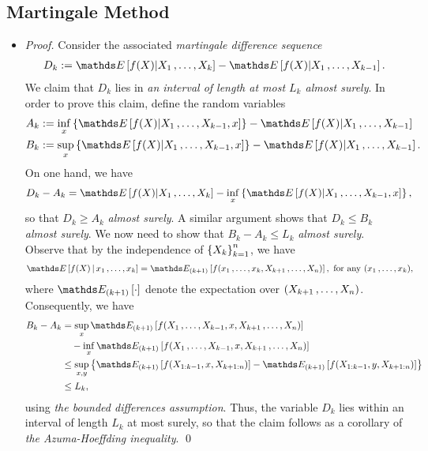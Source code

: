 \documentclass[11pt]{article}
\begin{document}
\subsection{Martingale Method}
\begin{itemize}
\item \begin{proof}
Consider the associated \emph{martingale difference sequence}
\begin{align*}
D_k := \E{}{f(X) | X_1 \xdotx{,} X_k} - \E{}{f(X) | X_1 \xdotx{,} X_{k-1}}.
\end{align*}
We claim that $D_k$ lies in \emph{an interval of length at most $L_k$ almost surely}. In order to prove this claim, define the random variables
\begin{align*}
A_k &:= \inf_x \set{\E{}{f(X) | X_1 \xdotx{,} X_{k-1}, x}} - \E{}{f(X) | X_1 \xdotx{,} X_{k-1}} \\
B_k &:= \sup_{x} \set{\E{}{f(X) | X_1 \xdotx{,} X_{k-1}, x}} - \E{}{f(X) | X_1 \xdotx{,} X_{k-1}}.
\end{align*}
On one hand, we have
\begin{align*}
D_k - A_k &=  \E{}{f(X) | X_1 \xdotx{,} X_k} - \inf_x \set{\E{}{f(X) | X_1 \xdotx{,} X_{k-1}, x}},
\end{align*}
so that $D_k \ge  A_k$ \emph{almost surely}. A similar argument shows that $D_k \le B_k$ \emph{almost surely}.
We now need to show that $B_k - A_k \le L_k$ \emph{almost surely}. Observe that by the independence of $\left\{X_k\right\}^n_{k=1}$, we have
\begin{align*}
\E{}{f(X) \,|\, x_1 \xdotx{,} x_k } &= \E{(k+1)}{f(x_1 \xdotx{,} x_k, X_{k+1} \xdotx{,} X_n)},\text{ for any }(x_1 \xdotx{,} x_k),
\end{align*}  where $\E{(k+1)}{\cdot}$ denote the expectation over $(X_{k+1} \,{,}\ldots{,}\, X_n)$.
Consequently, we have
\begin{align*}
B_k - A_k &=  \sup_{x} \E{(k+1)}{f(X_1 \xdotx{,} X_{k-1}, x, X_{k+1} \xdotx{,} X_n)}  \\
&\quad - \inf_x  \E{(k+1)}{f(X_1 \xdotx{,} X_{k-1}, x, X_{k+1} \xdotx{,} X_n)} \\
&\le  \sup_{x,y}\set{\E{(k+1)}{f(X_{1:k-1}, x, X_{k+1:n})} - \E{(k+1)}{f(X_{1:k-1}, y, X_{k+1:n})}} \\
&\le L_k,
\end{align*}
using \emph{the bounded differences assumption}. Thus, the variable $D_k$ lies within an interval of length $L_k$ at most surely, so that the claim follows as a corollary of \emph{the Azuma-Hoeffding inequality}. \qed
\end{proof}
\end{itemize}
\end{document}
